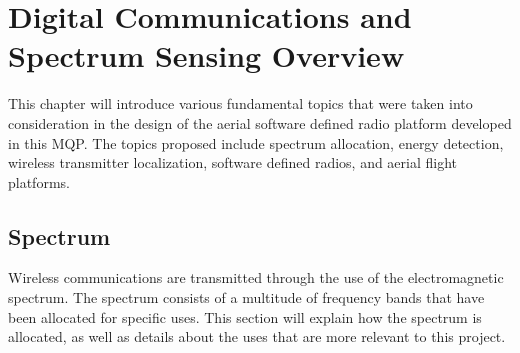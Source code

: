 \chapter{Digital Communications and Spectrum Sensing Overview}
This chapter will introduce various fundamental topics that were taken into consideration in the design of the aerial software defined radio platform developed in this MQP. The topics proposed include spectrum allocation, energy detection, wireless transmitter localization, software defined radios, and aerial flight platforms.

\section{Spectrum}
Wireless communications are transmitted through the use of the electromagnetic spectrum. The spectrum consists of a multitude of frequency bands that have been allocated for specific uses. This section will explain how the spectrum is allocated, as well as details about the uses that are more relevant to this project.

